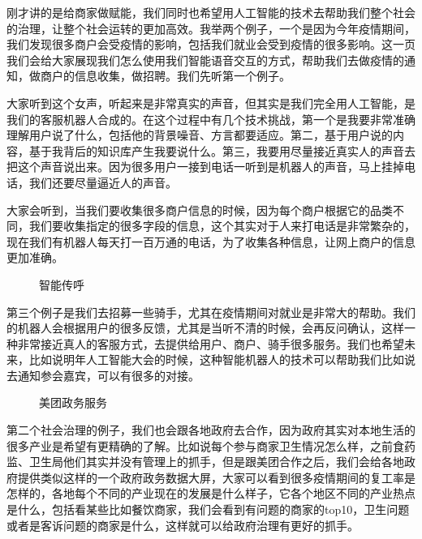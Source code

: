 \documentclass[letterpaper,11pt,english]{sphinxmanual}
\begin{document}
刚才讲的是给商家做赋能，我们同时也希望用人工智能的技术去帮助我们整个社会的治理，让整个社会运转的更加高效。我举两个例子，一个是因为今年疫情期间，我们发现很多商户会受疫情的影响，包括我们就业会受到疫情的很多影响。这一页我们会给大家展现我们怎么使用我们智能语音交互的方式，帮助我们去做疫情的通知，做商户的信息收集，做招聘。我们先听第一个例子。

大家听到这个女声，听起来是非常真实的声音，但其实是我们完全用人工智能，是我们的客服机器人合成的。在这个过程中有几个技术挑战，第一个是我要非常准确理解用户说了什么，包括他的背景噪音、方言都要适应。第二，基于用户说的内容，基于我背后的知识库产生我要说什么。第三，我要用尽量接近真实人的声音去把这个声音说出来。因为很多用户一接到电话一听到是机器人的声音，马上挂掉电话，我们还要尽量逼近人的声音。

大家会听到，当我们要收集很多商户信息的时候，因为每个商户根据它的品类不同，我们要收集指定的很多字段的信息，这个其实对于人来打电话是非常繁杂的，现在我们有机器人每天打一百万通的电话，为了收集各种信息，让网上商户的信息更加准确。

\begin{figure}[H]
\centering
\capstart

\noindent{}
\caption{智能传呼}\label{\detokenize{chapter_company/meituan:id26}}\end{figure}

第三个例子是我们去招募一些骑手，尤其在疫情期间对就业是非常大的帮助。我们的机器人会根据用户的很多反馈，尤其是当听不清的时候，会再反问确认，这样一种非常接近真人的客服方式，去提供给用户、商户、骑手很多服务。我们也希望未来，比如说明年人工智能大会的时候，这种智能机器人的技术可以帮助我们比如说去通知参会嘉宾，可以有很多的对接。

\begin{figure}[H]
\centering
\capstart

\noindent{}
\caption{美团政务服务}\label{\detokenize{chapter_company/meituan:id27}}\end{figure}

第二个社会治理的例子，我们也会跟各地政府去合作，因为政府其实对本地生活的很多产业是希望有更精确的了解。比如说每个参与商家卫生情况怎么样，之前食药监、卫生局他们其实并没有管理上的抓手，但是跟美团合作之后，我们会给各地政府提供类似这样的一个政府政务数据大屏，大家可以看到很多疫情期间的复工率是怎样的，各地每个不同的产业现在的发展是什么样子，它各个地区不同的产业热点是什么，包括看某些比如餐饮商家，我们会看到有问题的商家的top10，卫生问题或者是客诉问题的商家是什么，这样就可以给政府治理有更好的抓手。
\end{document}
